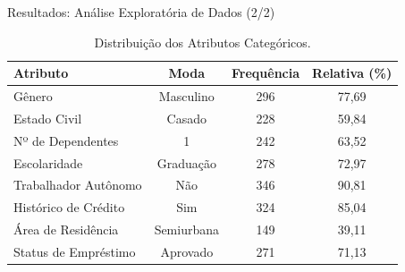 \documentclass[aspectratio=169]{beamer}
\begin{document}
\begin{frame}{Resultados: Análise Exploratória de Dados (2/2)}
\begin{table}[htbp]
    \centering
    \caption{Distribuição dos Atributos Categóricos.}
    \begin{tabular}{l|c|c|c} 
          \hline \hline
        \textbf{Atributo}     & \textbf{Moda} & \textbf{Frequência} & \textbf{Relativa (\%)} \\ 
          \hline \hline
        Gênero                & Masculino     & 296                 & 77,69 \\
        Estado Civil          & Casado        & 228                 & 59,84 \\
        Nº de Dependentes     & 1             & 242                 & 63,52 \\
        Escolaridade          & Graduação     & 278                 & 72,97 \\
        Trabalhador Autônomo  & Não           & 346                 & 90,81 \\
        Histórico de Crédito  & Sim           & 324                 & 85,04 \\
        Área de Residência    & Semiurbana    & 149                 & 39,11 \\
        Status de Empréstimo  & Aprovado      & 271                 & 71,13 \\ 
          \hline \hline
    \end{tabular} 
    \label{tab:2}
\end{table}
\end{frame}
\end{document}
